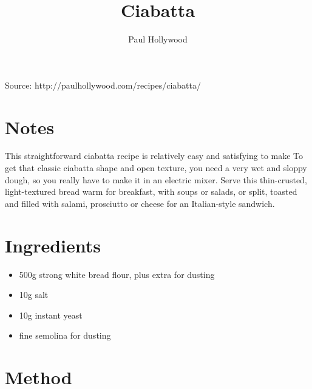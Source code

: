 \documentclass[12pt]{article}
\author{Paul Hollywood}
\title{Ciabatta}
\date{}
\begin{document}
\begin{multicols*}{2}
\maketitle

Source: http://paulhollywood.com/recipes/ciabatta/

\section{Notes}

This straightforward ciabatta recipe is relatively easy and satisfying to make To get that classic ciabatta shape and open texture, you need a very wet and sloppy dough, so you really have to make it in an electric mixer. Serve this thin-crusted, light-textured bread warm for breakfast, with soups or salads, or split, toasted and filled with salami, prosciutto or cheese for an Italian-style sandwich.

\section{Ingredients}

\begin{itemize}
    \item 500g strong white bread flour, plus extra for dusting
    \item 10g salt
    \item 10g instant yeast
    \item fine semolina for dusting
\end{itemize}

\section{Method}


\end{multicols*}
\end{document}
